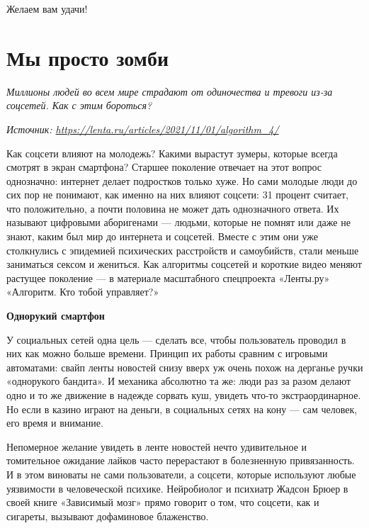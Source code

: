 Желаем вам удачи!

\clearpage



\section{Мы просто зомби}

\textit{Миллионы людей во всем мире страдают от одиночества и тревоги из-за соцсетей. Как с этим бороться?}

\textit{Источник: \url{https://lenta.ru/articles/2021/11/01/algorithm_4/}}

Как соцсети влияют на молодежь? Какими вырастут зумеры, которые всегда смотрят в экран смартфона? Старшее поколение отвечает на этот вопрос однозначно: интернет делает подростков только хуже. Но сами молодые люди до сих пор не понимают, как именно на них влияют соцсети: 31 процент считает, что положительно, а почти половина не может дать однозначного ответа. Их называют цифровыми аборигенами — людьми, которые не помнят или даже не знают, каким был мир до интернета и соцсетей. Вместе с этим они уже столкнулись с эпидемией психических расстройств и самоубийств, стали меньше заниматься сексом и жениться. Как алгоритмы соцсетей и короткие видео меняют растущее поколение — в материале масштабного спецпроекта «Ленты.ру» «Алгоритм. Кто тобой управляет?»

\textbf{Однорукий смартфон}

У социальных сетей одна цель --- сделать все, чтобы пользователь проводил в них как можно больше времени. Принцип их работы сравним с игровыми автоматами: свайп ленты новостей снизу вверх уж очень похож на дерганье ручки «однорукого бандита». И механика абсолютно та же: люди раз за разом делают одно и то же движение в надежде сорвать куш, увидеть что-то экстраординарное. Но если в казино играют на деньги, в социальных сетях на кону — сам человек, его время и внимание.

Непомерное желание увидеть в ленте новостей нечто удивительное и томительное ожидание лайков часто перерастают в болезненную привязанность. И в этом виноваты не сами пользователи, а соцсети, которые используют любые уязвимости в человеческой психике. Нейробиолог и психиатр Жадсон Брюер в своей книге «Зависимый мозг» прямо говорит о том, что соцсети, как и сигареты, вызывают дофаминовое блаженство.

